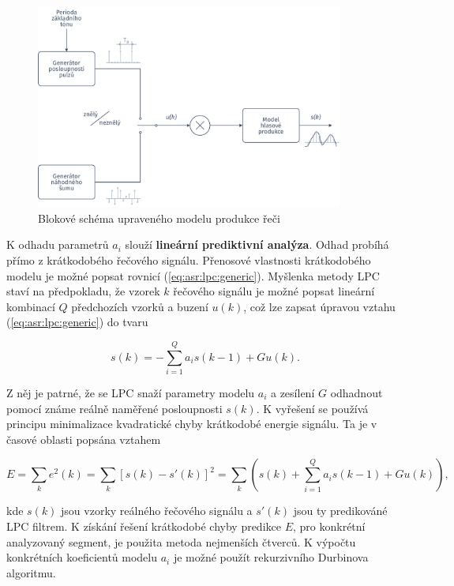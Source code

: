 \begin{figure}[hbpt]
  \centering
  \includegraphics[width=0.9\textwidth]{./ch4-asr/img/speech_process.pdf}
  \caption{Blokové schéma upraveného modelu produkce řeči}
  \label{fig:asr:model:speech:excitation}
\end{figure}

K odhadu parametrů $a_i$ slouží \textbf{lineární prediktivní analýza}. Odhad probíhá přímo z krátkodobého řečového signálu. Přenosové vlastnosti krátkodobého modelu je možné popsat rovnicí (\ref{eq:asr:lpc:generic}). Myšlenka metody LPC staví na předpokladu, že vzorek $k$ řečového signálu je možné popsat lineární kombinací $Q$ předchozích vzorků a buzení $u(k)$, což lze zapsat úpravou vztahu (\ref{eq:asr:lpc:generic}) do tvaru

\begin{equation}
  s(k) = - \sum_{i = 1}^{Q} a_i s(k-1) + Gu(k).
  \label{eq:asr:lpc:generic:edited}
\end{equation}

\noindent Z něj je patrné, že se LPC snaží parametry modelu $a_i$ a zesílení $G$ odhadnout pomocí známe reálně naměřené posloupnosti $s(k)$. K vyřešení se používá principu minimalizace kvadratické chyby krátkodobé energie signálu. Ta je v časové oblasti popsána vztahem

\begin{equation}
  E = \sum_{k} e^2(k) = \sum_{k} \left[ s(k) - s'(k)\right]^2 = \sum_{k} \left( s(k) + \sum_{i = 1}^{Q} a_i s(k-1) + Gu(k) \right),
\end{equation}

\noindent kde $s(k)$ jsou vzorky reálného řečového signálu a $s'(k)$ jsou ty predikováné LPC filtrem. K získání řešení krátkodobé chyby predikce $E$, pro konkrétní analyzovaný segment, je použita metoda nejmenších čtverců. K výpočtu konkrétních koeficientů modelu $a_i$ je možné použít rekurzivního Durbinova algoritmu. \cite{Holmes2001}

